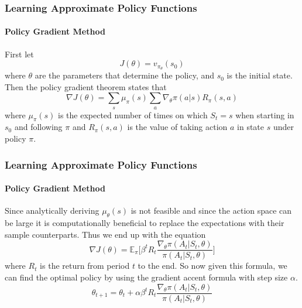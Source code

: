 \documentclass{beamer}
\begin{document}
\begin{frame}
  \frametitle{Learning Approximate Policy Functions}
  \framesubtitle{Policy Gradient Method}

  First let
  \begin{equation*}
    J(\theta) = v_{\pi_{\theta}} (s_0)
  \end{equation*}
  where $\theta$ are the parameters that determine the policy, and $s_0$ is the initial state.\\
  Then the policy gradient theorem states that
  \begin{equation*}
    \nabla J(\theta) = \sum_s \mu_{\pi}(s) \sum_a \nabla_\theta \pi(a|s)R_{\pi}(s, a)
  \end{equation*}
  where $\mu_\pi(s)$ is the expected number of times on which $S_t = s$ when starting in $s_0$ and following $\pi$ and $R_\pi(s, a)$ is the value of taking action $a$ in state $s$ under policy $\pi$.
\end{frame}


\begin{frame}
  \frametitle{Learning Approximate Policy Functions}
  \framesubtitle{Policy Gradient Method}
  Since analytically deriving $\mu_\theta(s)$ is not feasible and since the action space can be large it is computationally beneficial to replace the expectations with their sample counterparts. Thus we end up with the equation
  \begin{equation*}
    \nabla J(\theta) = \mathbb{E}_\pi \Bigg[\beta^t R_t \frac{\nabla_\theta\pi(A_t|S_t, \theta)}{\pi(A_t|S_t, \theta)} \Bigg]
  \end{equation*}
  where $R_t$ is the return from period $t$ to the end. So now given this formula, we can find the optimal policy by using the gradient accent formula with step size $\alpha$.
  \begin{equation*}
    \theta_{t+1}=\theta_t+\alpha \beta^t R_t \frac{\nabla_\theta\pi(A_t|S_t, \theta)}{\pi(A_t|S_t, \theta)}
  \end{equation*}
\end{frame}
\end{document}
